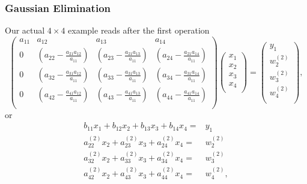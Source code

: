 \documentclass[compress]{beamer}
\begin{document}
\frame
{
  \frametitle{Gaussian Elimination}
\begin{small}
{\scriptsize
Our actual $4\times 4$ example reads after the first operation
\[
\left(\begin{array}{cccc}
                           a_{11}& a_{12} &a_{13}& a_{14}\\
                           0& (a_{22}-\frac{a_{21}a_{12}}{a_{11}}) &(a_{23}-\frac{a_{21}a_{13}}{a_{11}}) & (a_{24}-\frac{a_{21}a_{14}}{a_{11}})\\
0& (a_{32}-\frac{a_{31}a_{12}}{a_{11}})& (a_{33}-\frac{a_{31}a_{13}}{a_{11}})& (a_{34}-\frac{a_{31}a_{14}}{a_{11}})\\
0&(a_{42}-\frac{a_{41}a_{12}}{a_{11}}) &(a_{43}-\frac{a_{41}a_{13}}{a_{11}}) & (a_{44}-\frac{a_{41}a_{14}}{a_{11}}) \\
                      \end{array} \right)\left(\begin{array}{c}
                           x_1\\
                           x_2\\
                           x_3 \\
                           x_4  \\
                      \end{array} \right)
  =\left(\begin{array}{c}
                           y_1\\
                           w_2^{(2)}\\
                           w_3^{(2)} \\
                           w_4^{(2)}\\
                      \end{array} \right),
\]
or
\begin{eqnarray}
 b_{11}x_1 +b_{12}x_2 +b_{13}x_3 + b_{14}x_4=&y_1 \nonumber \\
 a^{(2)}_{22}x_2 + a^{(2)}_{23}x_3 + a^{(2)}_{24}x_4=&w^{(2)}_2 \nonumber \\
 a^{(2)}_{32}x_2 + a^{(2)}_{33}x_3 + a^{(2)}_{34}x_4=&w^{(2)}_3 \nonumber \\
 a^{(2)}_{42}x_2 + a^{(2)}_{43}x_3 + a^{(2)}_{44}x_4=&w^{(2)}_4, \nonumber \\
\end{eqnarray}
}
\end{small}
}
\end{document}
